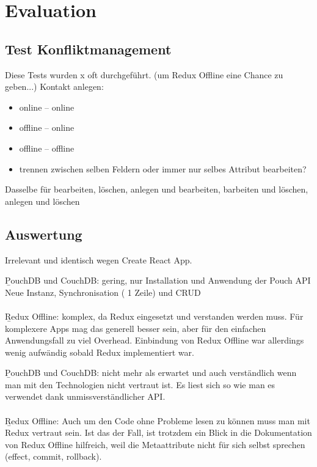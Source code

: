 \chapter{\label{chap:evaluation}Evaluation}
\section{Test Konfliktmanagement}
Diese Tests wurden x oft durchgeführt.
(um Redux Offline eine Chance zu geben...)
Kontakt anlegen:
\begin{itemize}
	\item online -- online
	\item offline -- online
	\item offline -- offline
	\item trennen zwischen selben Feldern oder immer nur selbes Attribut bearbeiten?
\end{itemize}
Dasselbe für bearbeiten, löschen,
anlegen und bearbeiten, barbeiten und löschen, anlegen und löschen\\

%
%
\section{Auswertung}
\begin{description}[leftmargin=0.7cm,style=nextline]
\item[Setup der App:] 
Irrelevant und identisch wegen Create React App.\\
\item[Einbinding der Technologien:] 
\b{PouchDB und CouchDB:} gering, nur Installation und Anwendung der Pouch API\\
Neue Instanz, Synchronisation ( 1 Zeile) und CRUD\\\\
\b{Redux Offline:} komplex, da Redux eingesetzt und verstanden werden muss. Für komplexere Apps mag das generell besser sein, aber für den einfachen Anwendungsfall zu viel Overhead. Einbindung von Redux Offline war allerdings wenig aufwändig sobald Redux implementiert war.\\
\item[Lesbarkeit des Codes:] 
\b{PouchDB und CouchDB:} nicht mehr als erwartet und auch verständlich wenn man mit den Technologien nicht vertraut ist. Es liest sich so wie man es verwendet dank unmissverständlicher API.\\\\
\b{Redux Offline:} Auch um den Code ohne Probleme lesen zu können muss man mit Redux vertraut sein. Ist das der Fall, ist trotzdem ein Blick in die Dokumentation von Redux Offline hilfreich, weil die Metaattribute nicht für sich selbst sprechen (effect, commit, rollback).\\
\end{description}
%
%
